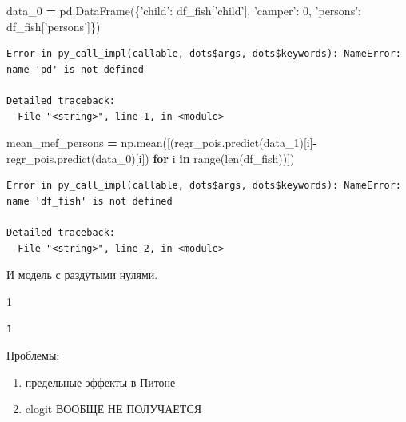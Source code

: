 \documentclass[]{book}
\newenvironment{Shaded}{\begin{snugshade}}{\end{snugshade}}
\newcommand{\BuiltInTok}[1]{#1}
\newcommand{\ControlFlowTok}[1]{\textcolor[rgb]{0.13,0.29,0.53}{\textbf{#1}}}
\newcommand{\DecValTok}[1]{\textcolor[rgb]{0.00,0.00,0.81}{#1}}
\newcommand{\KeywordTok}[1]{\textcolor[rgb]{0.13,0.29,0.53}{\textbf{#1}}}
\newcommand{\NormalTok}[1]{#1}
\newcommand{\OperatorTok}[1]{\textcolor[rgb]{0.81,0.36,0.00}{\textbf{#1}}}
\newcommand{\StringTok}[1]{\textcolor[rgb]{0.31,0.60,0.02}{#1}}
\providecommand{\tightlist}{%
  \setlength{\itemsep}{0pt}\setlength{\parskip}{0pt}}
\begin{document}
\begin{Shaded}
\begin{Highlighting}[]
\NormalTok{data_0 }\OperatorTok{=}\NormalTok{ pd.DataFrame(\{}\StringTok{'child'}\NormalTok{: df_fish[}\StringTok{'child'}\NormalTok{], }\StringTok{'camper'}\NormalTok{: }\DecValTok{0}\NormalTok{, }\StringTok{'persons'}\NormalTok{: df_fish[}\StringTok{'persons'}\NormalTok{]\})}
\end{Highlighting}
\end{Shaded}

\begin{verbatim}
Error in py_call_impl(callable, dots$args, dots$keywords): NameError: name 'pd' is not defined

Detailed traceback: 
  File "<string>", line 1, in <module>
\end{verbatim}

\begin{Shaded}
\begin{Highlighting}[]
\NormalTok{mean_mef_persons }\OperatorTok{=}\NormalTok{ np.mean([(regr_pois.predict(data_1)[i]}\OperatorTok{-}\NormalTok{regr_pois.predict(data_0)[i]) }
                            \ControlFlowTok{for}\NormalTok{ i }\KeywordTok{in} \BuiltInTok{range}\NormalTok{(}\BuiltInTok{len}\NormalTok{(df_fish))])}
\end{Highlighting}
\end{Shaded}

\begin{verbatim}
Error in py_call_impl(callable, dots$args, dots$keywords): NameError: name 'df_fish' is not defined

Detailed traceback: 
  File "<string>", line 2, in <module>
\end{verbatim}

И модель с раздутыми нулями.

\begin{Shaded}
\begin{Highlighting}[]
\DecValTok{1}
\end{Highlighting}
\end{Shaded}

\begin{verbatim}
1
\end{verbatim}

Проблемы:

\begin{enumerate}
\def\labelenumi{\arabic{enumi})}
\setcounter{enumi}{1}
\tightlist
\item
  предельные эффекты в Питоне
\item
  clogit ВООБЩЕ НЕ ПОЛУЧАЕТСЯ
\end{enumerate}
\end{document}
